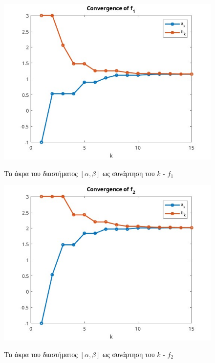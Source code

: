 \begin{figure}[H]
    \includegraphics[scale=0.7]{plots/ex3/f1.jpg}
    \label{fig:funcs}
    \caption{Τα άκρα του διαστήματος $[\alpha, \beta]$ ως συνάρτηση του $k$ - $f_1$}
    \centering
\end{figure}

\begin{figure}[H]
    \includegraphics[scale=0.7]{plots/ex3/f2.jpg}
    \label{fig:funcs}
    \caption{Τα άκρα του διαστήματος $[\alpha, \beta]$ ως συνάρτηση του $k$ - $f_2$}
    \centering
\end{figure}

